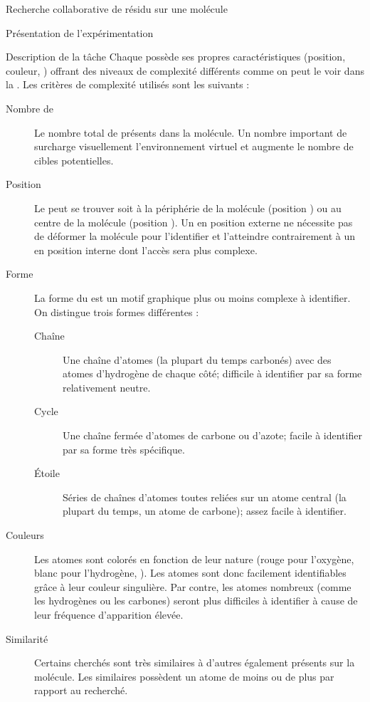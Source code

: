 \documentclass[myfrancais,ngerman,english,french]{mythesis}
\begin{document}
\begin{mychapter}{Recherche collaborative de résidu sur une molécule}
\begin{mysection}{Présentation de l'expérimentation}
\begin{mysubsection}{Description de la tâche}
				Chaque  possède ses propres caractéristiques (position, couleur, \myetc) offrant des niveaux de complexité différents comme on peut le voir dans la .
				Les critères de complexité utilisés sont les suivants :
				\begin{description}
					\item[Nombre de ] Le nombre total de  présents dans la molécule.
						Un nombre important de  surcharge visuellement l'environnement virtuel et augmente le nombre de cibles potentielles.
					\item[Position] Le  peut se trouver soit à la périphérie de la molécule (position ) ou au centre de la molécule (position ).
						Un  en position externe ne nécessite pas de déformer la molécule pour l'identifier et l'atteindre contrairement à un  en position interne dont l'accès sera plus complexe.
					\item[Forme] La forme du  est un motif graphique plus ou moins complexe à identifier.
						On distingue trois formes différentes :
						\begin{description}
							\item[Chaîne] Une chaîne d'atomes (la plupart du temps carbonés) avec des atomes d'hydrogène de chaque côté; difficile à identifier par sa forme relativement neutre.
							\item[Cycle] Une chaîne fermée d'atomes de carbone ou d'azote; facile à identifier par sa forme très spécifique.
							\item[Étoile] Séries de chaînes d'atomes toutes reliées sur un atome central (la plupart du temps, un atome de carbone); assez facile à identifier.
						\end{description}
					\item[Couleurs] Les atomes sont colorés en fonction de leur nature (rouge pour l'oxygène, blanc pour l'hydrogène, \myetc).
						Les atomes  sont donc facilement identifiables grâce à leur couleur singulière.
						Par contre, les atomes nombreux (comme les hydrogènes ou les carbones) seront plus difficiles à identifier à cause de leur fréquence d'apparition élevée.
					\item[Similarité] Certains  cherchés sont très similaires à d'autres  également présents sur la molécule.
						Les  similaires possèdent un atome de moins ou de plus par rapport au  recherché.

\end{description}
\end{mysubsection}
\end{mysection}
\end{mychapter}
\end{document}
